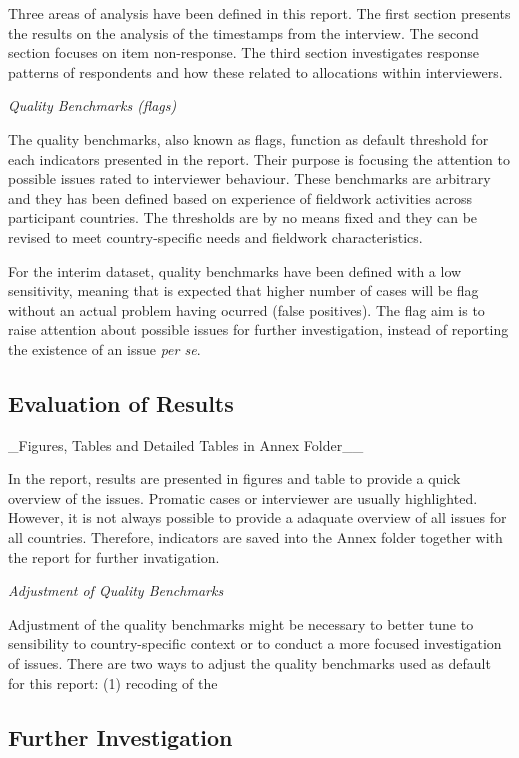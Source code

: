 \documentclass[
  11pt,
  a4paperpaper,
]{article}
\begin{document}
Three areas of analysis have been defined in this report. The first
section presents the results on the analysis of the timestamps from the
interview. The second section focuses on item non-response. The third
section investigates response patterns of respondents and how these
related to allocations within interviewers.

\emph{Quality Benchmarks (flags)}

The quality benchmarks, also known as flags, function as default
threshold for each indicators presented in the report. Their purpose is
focusing the attention to possible issues rated to interviewer
behaviour. These benchmarks are arbitrary and they has been defined
based on experience of fieldwork activities across participant
countries. The thresholds are by no means fixed and they can be revised
to meet country-specific needs and fieldwork characteristics.

For the interim dataset, quality benchmarks have been defined with a low
sensitivity, meaning that is expected that higher number of cases will
be flag without an actual problem having ocurred (false positives). The
flag aim is to raise attention about possible issues for further
investigation, instead of reporting the existence of an issue \emph{per
se}.

\hypertarget{evaluation-of-results}{%
\subsection{Evaluation of Results}\label{evaluation-of-results}}

\_Figures, Tables and Detailed Tables in Annex Folder\_\_

In the report, results are presented in figures and table to provide a
quick overview of the issues. Promatic cases or interviewer are usually
highlighted. However, it is not always possible to provide a adaquate
overview of all issues for all countries. Therefore, indicators are
saved into the Annex folder together with the report for further
invatigation.

\emph{Adjustment of Quality Benchmarks}

Adjustment of the quality benchmarks might be necessary to better tune
to sensibility to country-specific context or to conduct a more focused
investigation of issues. There are two ways to adjust the quality
benchmarks used as default for this report: (1) recoding of the

\hypertarget{further-investigation}{%
\subsection{Further Investigation}\label{further-investigation}}
\end{document}

